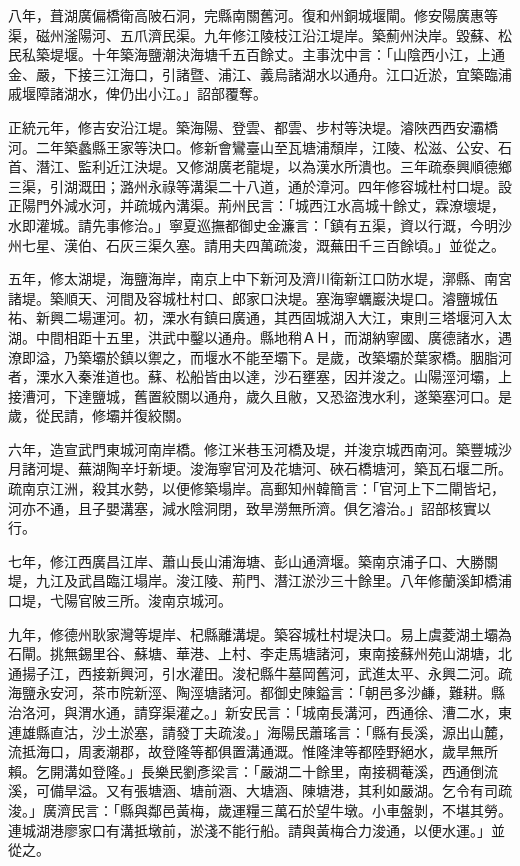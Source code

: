 八年，葺湖廣偏橋衛高陂石洞，完縣南關舊河。復和州銅城堰閘。修安陽廣惠等渠，磁州滏陽河、五爪濟民渠。九年修江陵枝江沿江堤岸。築薊州決岸。毀蘇、松民私築堤堰。十年築海鹽潮決海塘千五百餘丈。主事沈中言：「山陰西小江，上通金、嚴，下接三江海口，引諸暨、浦江、義烏諸湖水以通舟。江口近淤，宜築臨浦戚堰障諸湖水，俾仍出小江。」詔部覆奪。

正統元年，修吉安沿江堤。築海陽、登雲、都雲、步村等決堤。濬陜西西安灞橋河。二年築蠡縣王家等決口。修新會鸞臺山至瓦塘浦頹岸，江陵、松滋、公安、石首、潛江、監利近江決堤。又修湖廣老龍堤，以為漢水所潰也。三年疏泰興順德鄉三渠，引湖溉田；潞州永祿等溝渠二十八道，通於漳河。四年修容城杜村口堤。設正陽門外減水河，并疏城內溝渠。荊州民言：「城西江水高城十餘丈，霖潦壞堤，水即灌城。請先事修治。」寧夏巡撫都御史金濂言：「鎮有五渠，資以行溉，今明沙州七星、漢伯、石灰三渠久塞。請用夫四萬疏浚，溉蕪田千三百餘頃。」並從之。

五年，修太湖堤，海鹽海岸，南京上中下新河及濟川衛新江口防水堤，漷縣、南宮諸堤。築順天、河間及容城杜村口、郎家口決堤。塞海寧蠣巖決堤口。濬鹽城伍祐、新興二場運河。初，溧水有鎮曰廣通，其西固城湖入大江，東則三塔堰河入太湖。中間相距十五里，洪武中鑿以通舟。縣地稍ＡＨ，而湖納寧國、廣德諸水，遇潦即溢，乃築壩於鎮以禦之，而堰水不能至壩下。是歲，改築壩於葉家橋。胭脂河者，溧水入秦淮道也。蘇、松船皆由以達，沙石壅塞，因并浚之。山陽涇河壩，上接漕河，下達鹽城，舊置絞關以通舟，歲久且敝，又恐盜洩水利，遂築塞河口。是歲，從民請，修壩并復絞關。

六年，造宣武門東城河南岸橋。修江米巷玉河橋及堤，并浚京城西南河。築豐城沙月諸河堤、蕪湖陶辛圩新埂。浚海寧官河及花塘河、硤石橋塘河，築瓦石堰二所。疏南京江洲，殺其水勢，以便修築塌岸。高郵知州韓簡言：「官河上下二閘皆圮，河亦不通，且子嬰溝塞，減水陰洞閉，致旱澇無所濟。俱乞濬治。」詔部核實以行。

七年，修江西廣昌江岸、蕭山長山浦海塘、彭山通濟堰。築南京浦子口、大勝關堤，九江及武昌臨江塌岸。浚江陵、荊門、潛江淤沙三十餘里。八年修蘭溪卸橋浦口堤，弋陽官陂三所。浚南京城河。

九年，修德州耿家灣等堤岸、杞縣離溝堤。築容城杜村堤決口。易上虞菱湖土壩為石閘。挑無錫里谷、蘇塘、華港、上村、李走馬塘諸河，東南接蘇州苑山湖塘，北通揚子江，西接新興河，引水灌田。浚杞縣牛墓岡舊河，武進太平、永興二河。疏海鹽永安河，茶市院新涇、陶涇塘諸河。都御史陳鎰言：「朝邑多沙鹻，難耕。縣治洛河，與渭水通，請穿渠灌之。」新安民言：「城南長溝河，西通徐、漕二水，東連雄縣直沽，沙土淤塞，請發丁夫疏浚。」海陽民蕭瑤言：「縣有長溪，源出山麓，流抵海口，周袤潮郡，故登隆等都俱置溝通溉。惟隆津等都陸野絕水，歲旱無所賴。乞開溝如登隆。」長樂民劉彥梁言：「嚴湖二十餘里，南接稠菴溪，西通倒流溪，可備旱溢。又有張塘涵、塘前涵、大塘涵、陳塘港，其利如嚴湖。乞令有司疏浚。」廣濟民言：「縣與鄰邑黃梅，歲運糧三萬石於望牛墩。小車盤剝，不堪其勞。連城湖港廖家口有溝抵墩前，淤淺不能行船。請與黃梅合力浚通，以便水運。」並從之。

